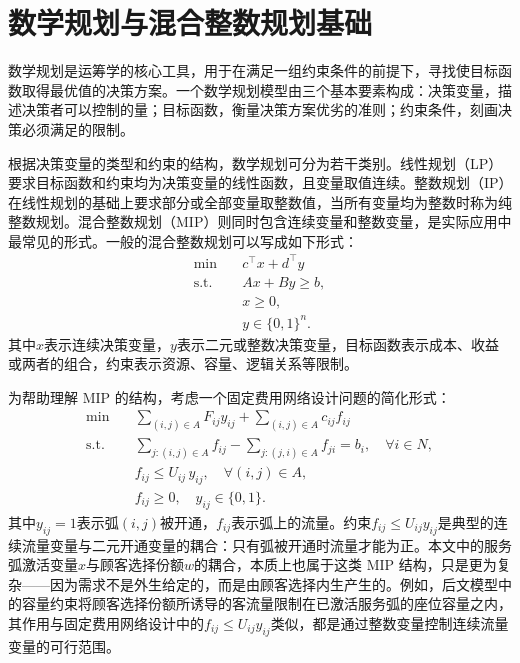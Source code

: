 \section{数学规划与混合整数规划基础}

数学规划是运筹学的核心工具，用于在满足一组约束条件的前提下，寻找使目标函数取得最优值的决策方案。一个数学规划模型由三个基本要素构成：决策变量，描述决策者可以控制的量；目标函数，衡量决策方案优劣的准则；约束条件，刻画决策必须满足的限制。

根据决策变量的类型和约束的结构，数学规划可分为若干类别。线性规划（LP）要求目标函数和约束均为决策变量的线性函数，且变量取值连续\citep{bertsimas1997introduction}。整数规划（IP）在线性规划的基础上要求部分或全部变量取整数值，当所有变量均为整数时称为纯整数规划。混合整数规划（MIP）则同时包含连续变量和整数变量，是实际应用中最常见的形式\citep{wolsey1998integer, nemhauser1988integer}。一般的混合整数规划可以写成如下形式：
\begin{equation}
\begin{aligned}
\min \quad & c^\top x + d^\top y \\
\text{s.t.}\quad & Ax + By \ge b,\\
& x \ge 0,\\
& y \in \{0,1\}^n.
\end{aligned}
\label{eq:general_mip}
\end{equation}
其中$x$表示连续决策变量，$y$表示二元或整数决策变量，目标函数表示成本、收益或两者的组合，约束表示资源、容量、逻辑关系等限制。

为帮助理解 MIP 的结构，考虑一个固定费用网络设计问题的简化形式：
\begin{equation}
\begin{aligned}
\min \quad & \sum_{(i,j)\in A} F_{ij} y_{ij} + \sum_{(i,j)\in A} c_{ij} f_{ij} \\
\text{s.t.}\quad & \sum_{j:(i,j)\in A} f_{ij} - \sum_{j:(j,i)\in A} f_{ji} = b_i, \quad \forall i\in N,\\
& f_{ij} \le U_{ij}\, y_{ij}, \quad \forall (i,j)\in A,\\
& f_{ij}\ge 0,\quad y_{ij}\in\{0,1\}.
\end{aligned}
\label{eq:fcnd}
\end{equation}
其中$y_{ij}=1$表示弧$(i,j)$被开通，$f_{ij}$表示弧上的流量。约束$f_{ij}\le U_{ij}y_{ij}$是典型的连续流量变量与二元开通变量的耦合：只有弧被开通时流量才能为正。本文中的服务弧激活变量$x$与顾客选择份额$w$的耦合，本质上也属于这类 MIP 结构，只是更为复杂——因为需求不是外生给定的，而是由顾客选择内生产生的。例如，后文模型中的容量约束将顾客选择份额所诱导的客流量限制在已激活服务弧的座位容量之内，其作用与固定费用网络设计中的$f_{ij}\le U_{ij}y_{ij}$类似，都是通过整数变量控制连续流量变量的可行范围。

